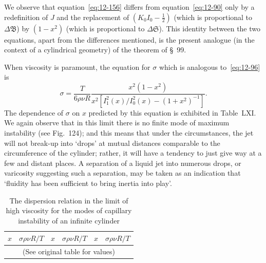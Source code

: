 

We observe that equation~\eqref{eq:12-156} differs from equation~\eqref{eq:12-90} only by a redefinition of $J$ and the replacement of $(K_0 I_0 - \frac{1}{2})$ (which is proportional to $\Delta\mathfrak{B}$) by $(1-x^2)$ (which is proportional to $\Delta\mathfrak{S}$). This identity between the two equations, apart from the differences mentioned, is the present analogue (in the context of a cylindrical geometry) of the theorem of \S~99.

When viscosity is paramount, the equation for $\sigma$ which is analogous to~\eqref{eq:12-96} is
\begin{equation}
\label{eq:12-158}
\sigma = \frac{T}{6\rho\nu R}\frac{x^2(1-x^2)}{x^2[I_1^2(x)/I_0^2(x)-(1+x^2)^{-1}]}.
\end{equation}
The dependence of $\sigma$ on $x$ predicted by this equation is exhibited in Table~LXI. We again observe that in this limit there is no finite mode of maximum instability (see Fig.~124); and this means that under the circumstances, the jet will not break-up into `drops' at mutual distances comparable to the circumference of the cylinder; rather, it will have a tendency to just give way at a few and distant places. A separation of a liquid jet into numerous drops, or varicosity suggesting such a separation, may be taken as an indication that `fluidity has been sufficient to bring inertia into play'.

\begin{table}[ht]
\centering
\caption{The dispersion relation in the limit of high viscosity for the modes of capillary instability of an infinite cylinder}
\label{tab:LXI}
\begin{tabular}{cccccc}
\hline
$x$ & $\sigma\rho\nu R/T$ & $x$ & $\sigma\rho\nu R/T$ & $x$ & $\sigma\rho\nu R/T$ \\
\hline
\multicolumn{6}{c}{(See original table for values)} \\
\hline
\end{tabular}
\end{table}

